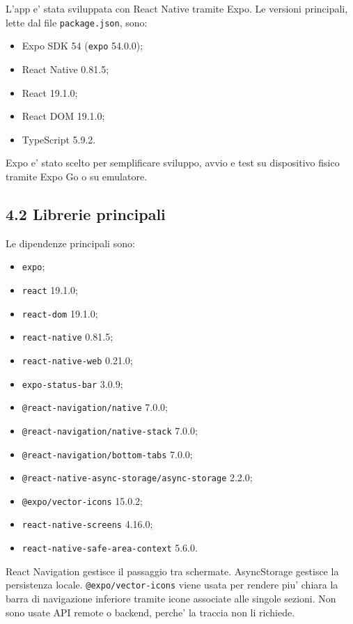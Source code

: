 \documentclass[11pt,a4paper]{article}
\begin{document}
L'app e' stata sviluppata con React Native tramite Expo. Le versioni principali, lette dal file \texttt{package.json}, sono:

\begin{itemize}
  \item Expo SDK 54 (\texttt{expo} 54.0.0);
  \item React Native 0.81.5;
  \item React 19.1.0;
  \item React DOM 19.1.0;
  \item TypeScript 5.9.2.
\end{itemize}

Expo e' stato scelto per semplificare sviluppo, avvio e test su dispositivo fisico tramite Expo Go o su emulatore.

\subsection{4.2 Librerie principali}

Le dipendenze principali sono:

\begin{itemize}
  \item \texttt{expo};
  \item \texttt{react} 19.1.0;
  \item \texttt{react-dom} 19.1.0;
  \item \texttt{react-native} 0.81.5;
  \item \texttt{react-native-web} 0.21.0;
  \item \texttt{expo-status-bar} 3.0.9;
  \item \texttt{@react-navigation/native} 7.0.0;
  \item \texttt{@react-navigation/native-stack} 7.0.0;
  \item \texttt{@react-navigation/bottom-tabs} 7.0.0;
  \item \texttt{@react-native-async-storage/async-storage} 2.2.0;
  \item \texttt{@expo/vector-icons} 15.0.2;
  \item \texttt{react-native-screens} 4.16.0;
  \item \texttt{react-native-safe-area-context} 5.6.0.
\end{itemize}

React Navigation gestisce il passaggio tra schermate. AsyncStorage gestisce la persistenza locale. \texttt{@expo/vector-icons} viene usata per rendere piu' chiara la barra di navigazione inferiore tramite icone associate alle singole sezioni. Non sono usate API remote o backend, perche' la traccia non li richiede.
\end{document}
